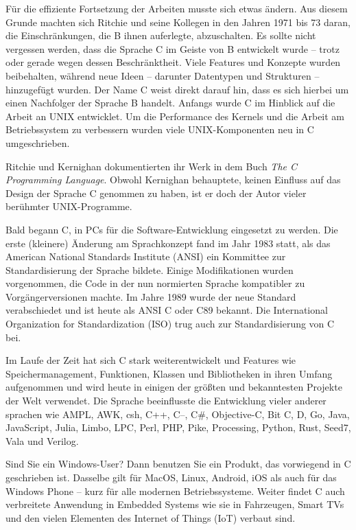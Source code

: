 \begin{appendices}
Für die effiziente Fortsetzung der Arbeiten musste sich etwas ändern. Aus diesem Grunde machten sich Ritchie und seine Kollegen in den Jahren 1971 bis 73 daran, die Einschränkungen, die B ihnen auferlegte, abzuschalten. Es sollte nicht vergessen werden, dass die Sprache C im Geiste von B entwickelt wurde -- trotz oder gerade wegen dessen Beschränktheit. Viele Features und Konzepte wurden beibehalten, während neue Ideen -- darunter Datentypen und Strukturen -- hinzugefügt wurden. Der Name C weist direkt darauf hin, dass es sich hierbei um einen Nachfolger der Sprache B handelt. Anfangs wurde C im Hinblick auf die Arbeit an UNIX entwicklet. Um die Performance des Kernels und die Arbeit am Betriebssystem zu verbessern wurden viele UNIX-Komponenten neu in C umgeschrieben.

Ritchie und Kernighan dokumentierten ihr Werk in dem Buch \emph{The C Programming Language}. Obwohl Kernighan behauptete, keinen Einfluss auf das Design der Sprache C genommen zu haben, ist er doch der Autor vieler berühmter UNIX-Programme.

Bald begann C, in PCs für die Software-Entwicklung eingesetzt zu werden. Die erste (kleinere) Änderung am Sprachkonzept fand im Jahr 1983 statt, als das American National Standards Institute (ANSI) ein Kommittee zur Standardisierung der Sprache bildete. Einige Modifikationen wurden vorgenommen, die Code in der nun normierten Sprache kompatibler zu Vorgängerversionen machte. Im Jahre 1989 wurde der neue Standard verabschiedet und ist heute als ANSI C oder C89 bekannt. Die International Organization for Standardization (ISO) trug auch zur Standardisierung von C bei.

Im Laufe der Zeit hat sich C stark weiterentwickelt und Features wie Speichermanagement, Funktionen, Klassen und Bibliotheken in ihren Umfang aufgenommen und wird heute in einigen der größten und bekanntesten Projekte der Welt verwendet. Die Sprache beeinflusste die Entwicklung vieler anderer sprachen wie AMPL, AWK, csh, C++, C--, C\#, Objective-C, Bit C, D, Go, Java, JavaScript, Julia, Limbo, LPC, Perl, PHP, Pike, Processing, Python, Rust, Seed7, Vala und Verilog. 

Sind Sie ein Windows-User? Dann benutzen Sie ein Produkt, das vorwiegend in C geschrieben ist. Dasselbe gilt für MacOS, Linux, Android, iOS als auch für das Windows Phone -- kurz für alle modernen Betriebssysteme. Weiter findet C auch verbreitete Anwendung in Embedded Systems wie sie in Fahrzeugen, Smart TVs und den vielen Elementen des Internet of Things (IoT) verbaut sind.


\end{appendices}
